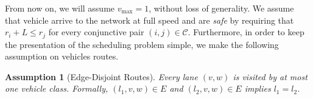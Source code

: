 \documentclass[a4paper]{article}
\theoremstyle{definition}
\theoremstyle{plain}
\newtheorem{assump}{Assumption}
\begin{document}

From now on, we will assume $v_{\max} = 1$, without loss of generality. We
assume that vehicle arrive to the network at full speed and are \textit{safe} by
requiring that $r_{i} + L \leq r_{j}$ for every conjunctive pair
$(i, j) \in \mathcal{C}$. Furthermore, in order to keep the presentation of the
scheduling problem simple, we make the following assumption on vehicles routes.
\begin{assump}[Edge-Disjoint Routes]\label{assump:edge_disjoint_routes}
  Every lane $(v,w)$ is visited by at most one vehicle class. Formally,
  $(l_{1},v,w) \in E$ and $(l_{2},v,w) \in E$ implies $l_{1}=l_{2}$.
\end{assump}
\end{document}

